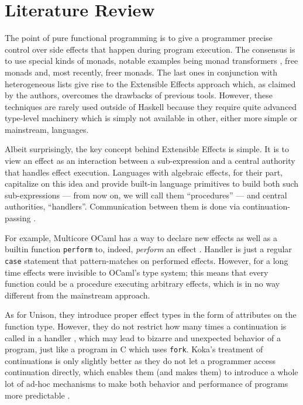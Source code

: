 \documentclass[a4paper,14pt]{extreport}
\begin{document}
\chapter{Literature Review}

The point of pure functional programming is to give a programmer precise control
over side effects that happen during program execution. The consensus is to use
special kinds of monads, notable examples being monad transformers \cite{mtl},
free monads \cite{free} and, most recently, freer monads. The last ones in
conjunction with heterogeneous lists give rise to the Extensible Effects
approach \cite{exteff} which, as claimed by the authors, overcomes the drawbacks
of previous tools. However, these techniques are rarely used outside of Haskell
because they require quite advanced type-level machinery which is simply not
available in other, either more simple or mainstream, languages.

Albeit surprisingly, the key concept behind Extensible Effects is simple. It is
to view an effect as an interaction between a sub-expression and a central
authority that handles effect execution. Languages with algebraic effects, for
their part, capitalize on this idea and provide built-in language primitives to
build both such sub-expressions --- from now on, we will call them
``procedures'' --- and central authorities, ``handlers''. Communication between
them is done via continuation-passing \cite{algeff}.

For example, Multicore OCaml has a way to declare new effects as well as a
builtin function \verb|perform| to, indeed, \textit{perform} an effect
\cite{ocaml}. Handler is just a regular \verb|case| statement that
pattern-matches on performed effects. However, for a long time effects were
invisible to OCaml's type system; this means that every function could be a
procedure executing arbitrary effects, which is in no way different from
the mainstream approach.

As for Unison, they introduce proper effect types in the form of attributes on
the function type. However, they do not restrict how many times a continuation
is called in a handler \cite{unrestricted}, which may lead to bizarre and
unexpected behavior of a program, just like a program in C which uses
\verb|fork|. Koka's treatment of continuations is only slightly better as they
do not let a programmer access continuation directly, which enables them (and
makes them) to introduce a whole lot of ad-hoc mechanisms to make both behavior
and performance of programs more predictable \cite{hidden}.
\end{document}
